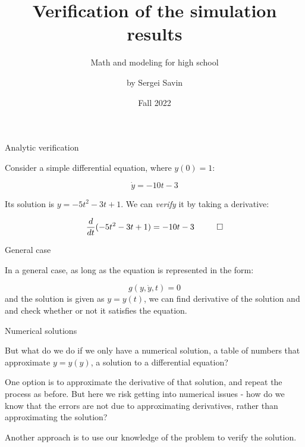 \documentclass{beamer}
\title{Verification of the simulation results}
\subtitle{Math and modeling for high school}
\author{by Sergei Savin}
\date{Fall 2022}
\begin{document}
\maketitle


\begin{frame}{Analytic verification}
	\begin{flushleft}
		
		Consider a simple differential equation, where $y(0) = 1$:
		
		\begin{equation}
			\dot y = -10t - 3
		\end{equation}
	
		Its solution is $y = -5t^2-3t+1$. We can \emph{verify} it by taking a derivative:
		
		\begin{equation}
			\frac{d}{dt}(-5t^2-3t+1) = -10t-3 \ \ \qed
		\end{equation}		
		
	\end{flushleft}
\end{frame}




\begin{frame}{General case}
	\begin{flushleft}
		
		In a general case, as long as the equation is represented in the form:
		
		\begin{equation}
			g(y, \dot y, t) = 0
		\end{equation}		
	and the solution is given as $y = y(t)$, we can find derivative of the solution and and check whether or not it satisfies the equation.
		
	\end{flushleft}
\end{frame}





\begin{frame}{Numerical solutions}
	\begin{flushleft}
		
		But what do we do if we only have a numerical solution, a table of numbers that approximate $y = y(y)$, a solution to a differential equation?
		
		\bigskip
		
		One option is to approximate the derivative of that solution, and repeat the process as before. But here we risk getting into numerical issues - how do we know that the errors are not due to approximating derivatives, rather than approximating the solution?
		
		\bigskip
		
		Another approach is to use our knowledge of the problem to verify the solution.
		
	\end{flushleft}
\end{frame}
\end{document}
